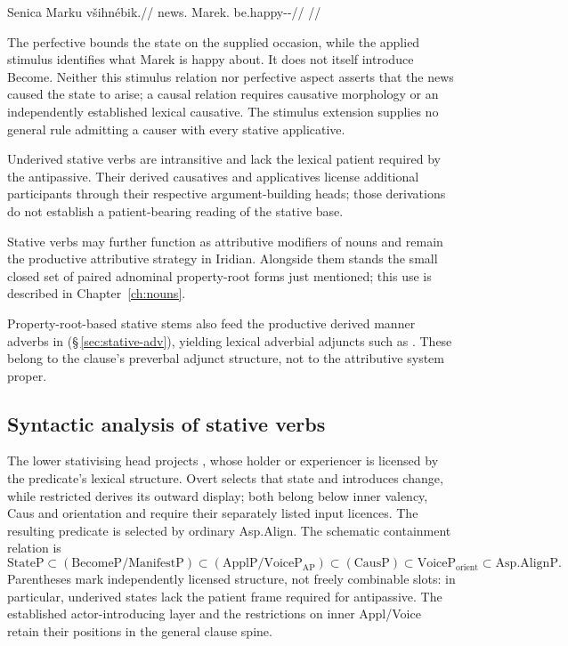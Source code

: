 \ex
\begingl
\gla Senica Marku všihnébik.//
\glb news.\Dir{} Marek.\Trs{} be.happy-\Appl{}-\Pf{}//
\glft {}
//
\endgl
\xe

The perfective bounds the state on the supplied occasion, while the applied
stimulus identifies what Marek is happy about. It does not itself introduce Become. Neither this stimulus relation nor
perfective aspect asserts that the news caused the state to arise; a causal
relation requires causative morphology or an independently established lexical
causative.
The stimulus extension supplies no general rule admitting a causer with every
stative applicative.

Underived stative verbs are intransitive and lack the lexical patient required
by the antipassive. Their derived causatives and applicatives license additional
participants through their respective argument-building heads; those
derivations do not establish a patient-bearing reading of the stative base.

Stative verbs may further function as attributive modifiers of nouns and remain
the productive attributive strategy in Iridian. Alongside them stands the small
closed set of paired adnominal property-root forms just mentioned; this use is
described in Chapter~\ref{ch:nouns}.

Property-root-based stative stems also feed the productive derived manner
adverbs in  (§\,\ref{sec:stative-adv}), yielding lexical adverbial
adjuncts such as  . These belong to the clause's
preverbal adjunct structure, not to the attributive system proper.

\subsection{Syntactic analysis of stative verbs}
\label{sec:vm-tension-stative}

The lower stativising head projects , whose holder or
experiencer is licensed by the predicate's lexical structure. Overt
 selects that state and introduces change, while restricted
 derives its outward display; both belong below inner
valency, Caus and orientation and require their separately listed input licences. The resulting predicate is selected by ordinary
Asp.Align. The schematic containment relation is
\[
\mathrm{StateP}\subset(\mathrm{BecomeP}/\mathrm{ManifestP})\subset
(\mathrm{ApplP}/\mathrm{VoiceP}_{\mathrm{AP}})\subset
(\mathrm{CausP})\subset\mathrm{VoiceP}_{\mathrm{orient}}
\subset\mathrm{Asp.AlignP}.
\]
Parentheses mark independently licensed structure, not freely combinable
slots: in particular, underived states lack the patient frame required for
antipassive. The established actor-introducing layer and the restrictions on
inner Appl/Voice retain their positions in the general clause spine.

